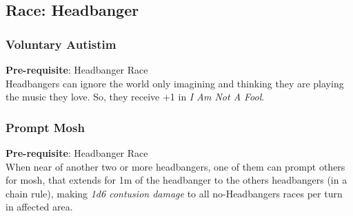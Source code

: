 \documentclass[ letterpaper,12pt]{article}
\begin{document}
\subsection{Race: Headbanger}

\subsubsection{Voluntary Autistim}
{\bf Pre-requisite}: Headbanger Race\\
Headbangers can ignore the world only imagining and thinking they are playing the music they love. So, they receive +1 in {\it I Am Not A Fool}.\\

\subsubsection{Prompt Mosh}
 {\bf Pre-requisite}: Headbanger Race\\
 When near of another two or more headbangers, one of them can prompt others for mosh, that extends for 1m of the headbanger to the others headbangers (in a chain rule), making {\it 1d6 contusion damage} to all no-Headbangers races per turn in affected area.
\end{document}
